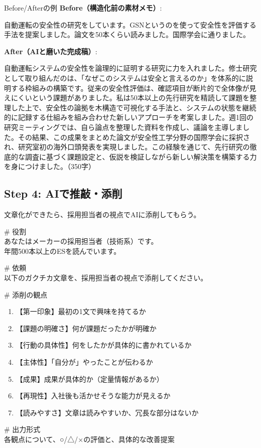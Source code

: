 \begin{itembox}[l]{Before/Afterの例}
\textbf{Before（構造化前の素材メモ）}:

自動運転の安全性の研究をしています。GSNというのを使って安全性を評価する手法を提案しました。論文を50本くらい読みました。国際学会に通りました。

\textbf{After（AIと磨いた完成稿）}:

自動運転システムの安全性を論理的に証明する研究に力を入れました。修士研究として取り組んだのは、「なぜこのシステムは安全と言えるのか」を体系的に説明する枠組みの構築です。従来の安全性評価は、確認項目が断片的で全体像が見えにくいという課題がありました。私は50本以上の先行研究を精読して課題を整理した上で、安全性の論拠を木構造で可視化する手法と、システムの状態を継続的に記録する仕組みを組み合わせた新しいアプローチを考案しました。週1回の研究ミーティングでは、自ら論点を整理した資料を作成し、議論を主導しました。その結果、この成果をまとめた論文が安全性工学分野の国際学会に採択され、研究室初の海外口頭発表を実現しました。この経験を通じて、先行研究の徹底的な調査に基づく課題設定と、仮説を検証しながら新しい解決策を構築する力を身につけました。（350字）
\end{itembox}

\subsection{Step 4: AIで推敲・添削}

文章化ができたら、採用担当者の視点でAIに添削してもらう。

\begin{promptbox}
\# 役割\\
あなたはメーカーの採用担当者（技術系）です。\\
年間500本以上のESを読んでいます。

\# 依頼\\
以下のガクチカ文章を、採用担当者の視点で添削してください。

\# 添削の観点
\begin{enumerate}
\item 【第一印象】最初の1文で興味を持てるか
\item 【課題の明確さ】何が課題だったかが明確か
\item 【行動の具体性】何をしたかが具体的に書かれているか
\item 【主体性】「自分が」やったことが伝わるか
\item 【成果】成果が具体的か（定量情報があるか）
\item 【再現性】入社後も活かせそうな能力が見えるか
\item 【読みやすさ】文章は読みやすいか、冗長な部分はないか
\end{enumerate}

\# 出力形式\\
各観点について、○/△/×の評価と、具体的な改善提案
\end{promptbox}

